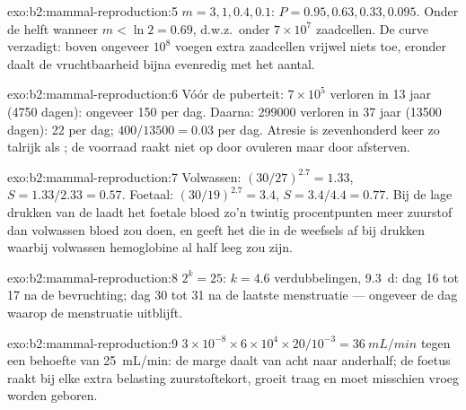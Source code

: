 \begin{solution}{exo:b2:mammal-reproduction:5}
$m = 3, 1, 0.4, 0.1$: $P = 0.95, 0.63, 0.33, 0.095$. Onder de helft
wanneer $m < \ln 2 = 0.69$, d.w.z.\ onder $7\times 10^{7}$ zaadcellen. De
curve verzadigt: boven ongeveer $10^{8}$ voegen extra zaadcellen vrijwel
niets toe, eronder daalt de vruchtbaarheid bijna evenredig met het aantal.
\end{solution}

\begin{solution}{exo:b2:mammal-reproduction:6}
Vóór de puberteit: $7\times 10^{5}$ verloren in 13 jaar (\num{4750} dagen):
ongeveer 150 per dag. Daarna: \num{299000} verloren in 37 jaar (\num{13500}
dagen): 22 per dag;  $400/\num{13500} = 0.03$ per dag. Atresie is
zevenhonderd keer zo talrijk als ; de voorraad raakt niet op door
ovuleren maar door afsterven.
\end{solution}

\begin{solution}{exo:b2:mammal-reproduction:7}
Volwassen: $(30/27)^{2.7} = 1.33$, $S = 1.33/2.33 = 0.57$. Foetaal:
$(30/19)^{2.7} = 3.4$, $S = 3.4/4.4 = 0.77$. Bij de lage drukken van de
 laadt het foetale bloed zo'n twintig procentpunten meer zuurstof
dan volwassen bloed zou doen, en geeft het die in de weefsels af bij
drukken waarbij volwassen hemoglobine al half leeg zou zijn.
\end{solution}

\begin{solution}{exo:b2:mammal-reproduction:8}
$2^{k} = 25$: $k = 4.6$ verdubbelingen, \qty{9.3}{d}: dag 16 tot 17 na de
bevruchting; dag 30 tot 31 na de laatste menstruatie --- ongeveer de dag
waarop de menstruatie uitblijft.
\end{solution}

\begin{solution}{exo:b2:mammal-reproduction:9}
$3\times 10^{-8}\times 6\times 10^{4}\times 20/10^{-3} =
\qty{36}{mL/min}$ tegen een behoefte van \qty{25}{mL/min}: de marge daalt
van acht naar anderhalf; de foetus raakt bij elke extra belasting
zuurstoftekort, groeit traag en moet misschien vroeg worden geboren.
\end{solution}

